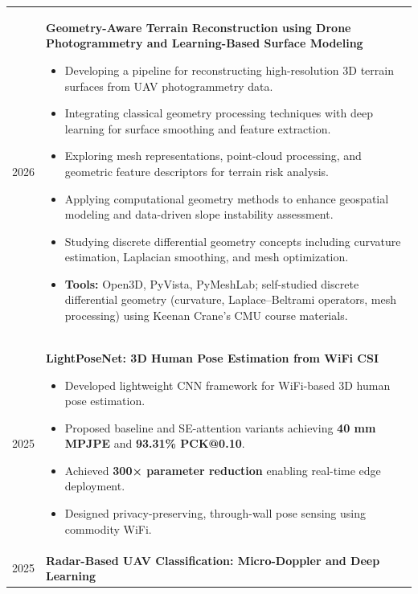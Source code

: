 \documentclass[11pt]{article}
\begin{document}
\begingroup
\renewcommand{\arraystretch}{1.1}
\begin{tabularx}{\textwidth}{@{}p{95pt}X@{}}

2026 &
\textbf{Geometry-Aware Terrain Reconstruction using Drone Photogrammetry and Learning-Based Surface Modeling}

\begin{itemize}[leftmargin=*,nosep]
\item Developing a pipeline for reconstructing high-resolution 3D terrain surfaces from UAV photogrammetry data.
\item Integrating classical geometry processing techniques with deep learning for surface smoothing and feature extraction.
\item Exploring mesh representations, point-cloud processing, and geometric feature descriptors for terrain risk analysis.
\item Applying computational geometry methods to enhance geospatial modeling and data-driven slope instability assessment.
\item Studying discrete differential geometry concepts including curvature estimation, Laplacian smoothing, and mesh optimization.
\item \textbf{Tools:} Open3D, PyVista, PyMeshLab; self-studied discrete differential geometry (curvature, Laplace–Beltrami operators, mesh processing) using Keenan Crane’s CMU course materials.

\end{itemize}
\\[6pt]

2025 &
\textbf{LightPoseNet: 3D Human Pose Estimation from WiFi CSI}

\begin{itemize}[leftmargin=*,nosep]
\item Developed lightweight CNN framework for WiFi-based 3D human pose estimation.
\item Proposed baseline and SE-attention variants achieving \textbf{40 mm MPJPE} and \textbf{93.31\% PCK@0.10}.
\item Achieved \textbf{300× parameter reduction} enabling real-time edge deployment.
\item Designed privacy-preserving, through-wall pose sensing using commodity WiFi.
\end{itemize}
\\[6pt]

2025 &
\textbf{Radar-Based UAV Classification: Micro-Doppler and Deep Learning}


\end{tabularx}
\end{document}
